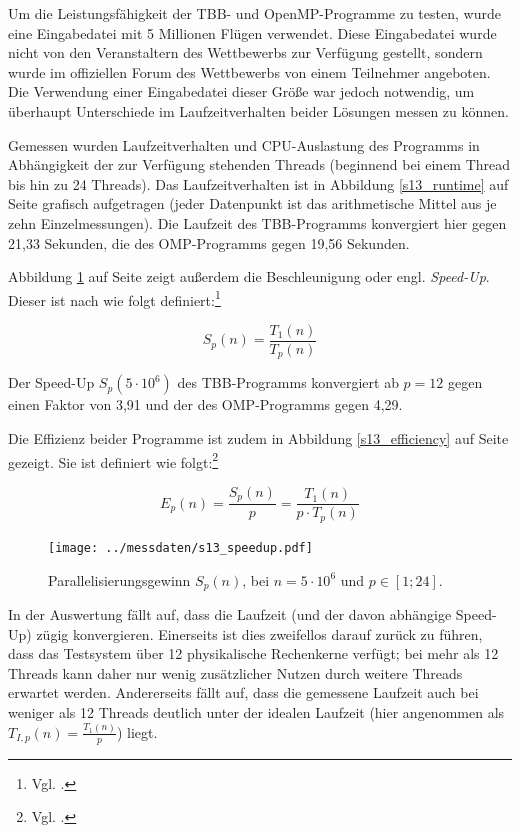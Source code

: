 \documentclass[11pt]{scrartcl}
\begin{document}
Um die Leistungsfähigkeit der TBB- und OpenMP-Programme zu testen, wurde eine Eingabedatei mit 5 Millionen Flügen verwendet. Diese Eingabedatei wurde nicht von den Veranstaltern des Wettbewerbs zur Verfügung gestellt, sondern wurde im offiziellen Forum des Wettbewerbs von einem Teilnehmer angeboten. Die Verwendung einer Eingabedatei dieser Größe war jedoch notwendig, um überhaupt Unterschiede im Laufzeitverhalten beider Lösungen messen zu können.

Gemessen wurden Laufzeitverhalten und CPU-Auslastung des Programms in Abhängigkeit der zur Verfügung stehenden Threads (beginnend bei einem Thread bis hin zu 24 Threads). Das Laufzeitverhalten ist in Abbildung \ref{s13_runtime} auf Seite \pageref{s13_runtime} grafisch aufgetragen (jeder Datenpunkt ist das arithmetische Mittel aus je zehn Einzelmessungen). Die Laufzeit des TBB-Programms konvergiert hier gegen 21,33 Sekunden, die des OMP-Programms gegen 19,56 Sekunden.

Abbildung \ref{s13_speedup} auf Seite \pageref{s13_speedup} zeigt außerdem die Beschleunigung oder engl. \emph{Speed-Up}. Dieser ist nach  wie folgt definiert:\footnote{Vgl. \cite[S.~162]{rauber_parallel_2010}.}

\begin{equation}
S_p(n) = \frac{T_1(n)}{T_p(n)}
\end{equation}

Der Speed-Up $S_p(5\cdot 10^6)$ des TBB-Programms konvergiert ab $p=12$ gegen einen Faktor von 3,91 und der des OMP-Programms gegen 4,29.

Die Effizienz beider Programme ist zudem in Abbildung \ref{s13_efficiency} auf Seite \pageref{s13_efficiency} gezeigt. Sie ist definiert wie folgt:\footnote{Vgl. \cite[S.~164]{rauber_parallel_2010}.}

\begin{equation}
E_p(n) = \frac{S_p(n)}{p} = \frac{T_1(n)}{p \cdot T_p(n)}
\end{equation}

\begin{figure}[pbt]
\centering
\texttt{[image: ../messdaten/s13\_speedup.pdf]}
\caption{Parallelisierungsgewinn $S_p(n)$, bei $n=5\cdot 10^6$ und $p \in [1;24]$.}
\label{s13_speedup}
\end{figure}

In der Auswertung fällt auf, dass die Laufzeit (und der davon abhängige Speed-Up) zügig konvergieren. Einerseits ist dies zweifellos darauf zurück zu führen, dass das Testsystem über 12 physikalische Rechenkerne verfügt; bei mehr als 12 Threads kann daher nur wenig zusätzlicher Nutzen durch weitere Threads erwartet werden. Andererseits fällt auf, dass die gemessene Laufzeit auch bei weniger als 12 Threads deutlich unter der idealen Laufzeit (hier angenommen als $T_{I,p}(n) = \frac{T_1(n)}{p}$) liegt.
\end{document}
